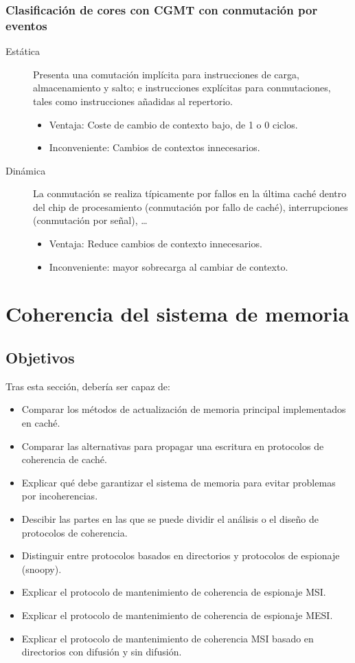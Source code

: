 \subsubsection{Clasificación de cores con CGMT con conmutación por eventos}
\begin{description}
    \item [Estática] Presenta una comutación implícita para instrucciones de carga, almacenamiento y salto; e instrucciones explícitas para conmutaciones, tales como instrucciones añadidas al repertorio.
        \begin{itemize}
            \item Ventaja: Coste de cambio de contexto bajo, de 1 o 0 ciclos.
            \item Inconveniente: Cambios de contextos innecesarios.
        \end{itemize}
    \item [Dinámica] La conmutación se realiza típicamente por fallos en la última caché dentro del chip de procesamiento (conmutación por fallo de caché), interrupciones (conmutación por señal), \ldots
        \begin{itemize}
            \item Ventaja: Reduce cambios de contexto innecesarios.
            \item Inconveniente: mayor sobrecarga al cambiar de contexto.
        \end{itemize}
\end{description}




\section{Coherencia del sistema de memoria}
\subsection{Objetivos}
Tras esta sección, debería ser capaz de:
\begin{itemize}
    \item Comparar los métodos de actualización de memoria principal implementados en caché.
    \item Comparar las alternativas para propagar una escritura en protocolos de coherencia de caché.
    \item Explicar qué debe garantizar el sistema de memoria para evitar problemas por incoherencias.
    \item Descibir las partes en las que se puede dividir el análisis o el diseño de protocolos de coherencia.
    \item Distinguir entre protocolos basados en directorios y protocolos de espionaje (snoopy).
    \item Explicar el protocolo de mantenimiento de coherencia de espionaje MSI.
    \item Explicar el protocolo de mantenimiento de coherencia de espionaje MESI.
    \item Explicar el protocolo de mantenimiento de coherencia MSI basado en directorios con difusión y sin difusión.
\end{itemize}


